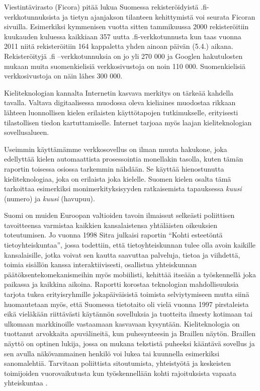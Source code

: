 \documentclass[]{../../metanetpaper}
\begin{document}
\begin{Parallel}[c]{77mm}{77mm}
{Viestintävirasto (Ficora) pitää lukua Suomessa rekisteröidyistä
.fi-verkkotunnuksista ja tietyn ajanjakson tilanteen kehittymistä voi
seurata Ficoran sivuilla. Esimerkiksi kymmenisen vuotta sitten
tammikuussa 2000 rekisteröitiin kuukauden kuluessa kaikkiaan 357 uutta
.fi-verkkotunnusta kun taas vuonna 2011 niitä rekisteröitiin 164
kappaletta yhden ainoan päivän (5.4.)  aikana. Rekisteröityjä .fi
–verkkotunnuksia on jo yli 270 000 ja Googlen hakutulosten mukaan
muita suomenkielisiä verkkosivustoja on noin 110 000.  Suomenkielisiä
verkkosivustoja on näin lähes 300 000.

Kieliteknologian kannalta Internetin kasvava merkitys on tärkeää
kahdella tavalla. Valtava digitaalisessa muodossa oleva kieliaines
muodostaa rikkaan lähteen luonnollisen kielen erilaisten käyttötapojen
tutkimukselle, erityisesti tilastollisen tiedon
kartuttamiselle. Internet tarjoaa myös laajan kieliteknologian
sovellusalueen.

Useimmin käyttämämme verkkosovellus on ilman muuta hakukone, joka
edellyttää kielen automaattista prosessointia monellakin tasolla,
kuten tämän raportin toisessa osiossa tarkemmin nähdään. Se käyttää
hienostunutta kieliteknologiaa, joka on erilaista joka
kielelle. Suomen kielen osalta tämä tarkoittaa esimerkiksi
monimerkityksisyyden ratkaisemista tapauksessa \textit{kuusi} (numero)
ja \textit{kuusi} (havupuu).

Suomi on muiden Euroopan valtioiden tavoin ilmaissut selkeästi
poliittisen tavoitteensa varmistaa kaikkien kansalaistensa yhtäläisten
oikeuksien toteutumisen. Jo vuonna 1998 Sitra julkaisi raportin “Kohti
esteetöntä tietoyhteiskuntaa”, jossa todettiin, että tietoyhteiskunnan
tulee olla avoin kaikille kansalaisille, jotka voivat sen kautta
saavuttaa palveluja, tietoa ja viihdettä, toimia sisällön kanssa
interaktiivisesti, osallistua yhteiskunnan päätöksentekomekanismeihin
myös mobiilisti, kehittää itseään a työskennellä joka paikassa ja
kaikkina aikoina. Raportti korostaa teknologian mahdollisuuksia
tarjota tukea erityisryhmille jokapäiväisistä toimista selviytymiseen
mutta siinä huomautetaan myös, että Suomessa tietotaito oli vielä
vuonna 1997 pirstaleista eikä vieläkään riittävästi käytännön
sovelluksia ja tuotteita ilmesty kotimaan tai ulkomaan markkinoille
vastaamaan kasvavaan kysyntään. Kieliteknologia on tuottanut
arvokkaita apuvälineitä, kun puhesynteesin ja Braillen
näytön. Braillen näyttö on optinen lukija, jossa on mukana tekstistä
puheeksi kääntävä sovellus ja sen avulla näkövammainen henkilö voi
lukea tai kuunnella esimerkiksi sanomalehtiä. Tarvitaan poliittista
sitoutumista, yhteistyötä ja keskeisten toimijoiden vuorovaikutusta
kun työskennellään kohti rajoituksista vapaata
yhteiskuntaa \cite{Sitra1998}.

}
\end{Parallel}
\end{document}
